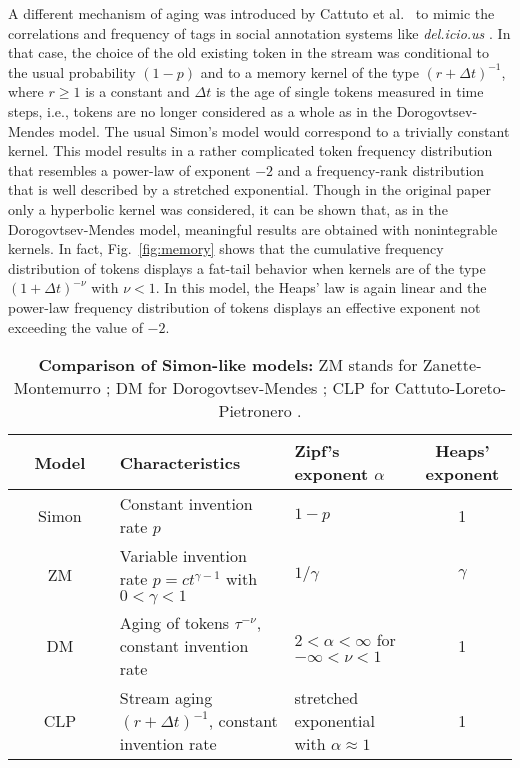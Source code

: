 \documentclass[graybox]{svmult}
\begin{document}
A different mechanism of aging was introduced by Cattuto et al.~\cite{cattuto_pnas,cattuto_epl} to mimic the correlations and frequency of tags in social annotation systems like \emph{del.icio.us} \cite{delicious}.
In that case, the choice of the old existing token in the stream was conditional to the usual probability $(1-p)$ and to a memory kernel of the type $(r+\Delta t)^{-1}$, where $r\ge1$ is a constant and $\Delta t$ is the age of single tokens measured in time steps, i.e., tokens are no longer considered as a whole as in the Dorogovtsev-Mendes model. 
The usual Simon's model would correspond to a trivially constant kernel. 
This model results in a rather complicated token frequency distribution that resembles a power-law of exponent $-2$ and a frequency-rank distribution that is well described by a stretched exponential. 
Though in the original paper only a hyperbolic kernel was considered, it can be shown that, as in the Dorogovtsev-Mendes model, meaningful results are obtained with nonintegrable kernels. 
In fact, Fig.~\ref{fig:memory} shows that the cumulative frequency distribution of tokens displays a fat-tail behavior when kernels are of the type $(1+\Delta t)^{-\nu}$ with $\nu<1$.
In this model, the Heaps' law is again linear and the power-law frequency distribution of tokens displays an effective exponent not exceeding the value of $-2$.

{\renewcommand{\arraystretch}{1.2}
\begin{table}[t]
\begin{center}
 \begin{tabular}{|c|p{4cm}|p{4cm}|c|}
\hline
  \textbf{~~Model~~} & \centering \textbf{Characteristics} & \centering \textbf{\boldmath Zipf's exponent $\alpha$} & \textbf{Heaps' exponent}\\
\hline
\hline
Simon & Constant invention rate $p$ & \centering $1-p$ & 1\\
\hline
ZM & Variable invention rate $p=ct^{\gamma-1}$ with $0<\gamma<1$& \centering $1/\gamma$ & $\gamma$\\
\hline
DM & Aging of tokens $\tau^{-\nu}$, constant invention rate & \centering $2<\alpha<\infty$ for $-\infty<\nu<1$ & 1\\
\hline
CLP & Stream aging $(r+\Delta t)^{-1}$, constant invention rate & \centering stretched exponential with $\alpha\approx 1$& 1\\
\hline
 \end{tabular}
\caption{\textbf{Comparison of Simon-like models:}
  ZM stands for Zanette-Montemurro \cite{zanette2005}; DM for Dorogovtsev-Mendes \cite{mendes2000}; CLP for Cattuto-Loreto-Pietronero \cite{cattuto_pnas}.
\label{tab:models}}
\end{center}
\end{table}
}
\end{document}
